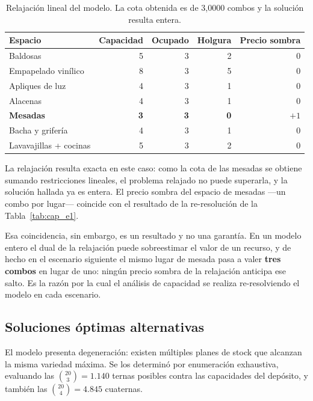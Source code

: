 \documentclass[10pt,a4paper]{article}
\newcommand{\cuello}[1]{\textbf{\textcolor{limita}{#1}}}
\begin{document}
\begin{table}[H]
\centering\small
\caption{Relajación lineal del modelo. La cota obtenida es de 3,0000 combos y
la solución resulta entera.}
\label{tab:relajacion_e1}
\begin{tabular}{lrrr r}
\toprule
\textbf{Espacio} & \textbf{Capacidad} & \textbf{Ocupado} & \textbf{Holgura} & \textbf{Precio sombra} \\
\midrule
Baldosas               & 5 & 3 & 2 & 0 \\
Empapelado vinílico    & 8 & 3 & 5 & 0 \\
Apliques de luz        & 4 & 3 & 1 & 0 \\
Alacenas               & 4 & 3 & 1 & 0 \\
\cuello{Mesadas}       & \cuello{3} & \cuello{3} & \cuello{0} & \cuello{$+1$} \\
Bacha y grifería       & 4 & 3 & 1 & 0 \\
Lavavajillas + cocinas & 5 & 3 & 2 & 0 \\
\bottomrule
\end{tabular}
\end{table}

La relajación resulta exacta en este caso: como la cota de las mesadas se
obtiene sumando restricciones lineales, el problema relajado no puede superarla,
y la solución hallada ya es entera. El precio sombra del espacio de mesadas
—un combo por lugar— coincide con el resultado de la re-resolución de la
Tabla~\ref{tab:cap_e1}.

Esa coincidencia, sin embargo, es un resultado y no una garantía. En un modelo
entero el dual de la relajación puede sobreestimar el valor de un recurso, y de
hecho en el escenario siguiente el mismo lugar de mesada pasa a valer
\textbf{tres combos} en lugar de uno: ningún precio sombra de la relajación
anticipa ese salto. Es la razón por la cual el análisis de capacidad se realiza
re-resolviendo el modelo en cada escenario.

\subsection{Soluciones óptimas alternativas}
\label{sec:esc1_alt}

El modelo presenta degeneración: existen múltiples planes de stock que alcanzan
la misma variedad máxima. Se los determinó por enumeración exhaustiva,
evaluando las $\binom{20}{3} = 1.140$ ternas posibles contra las capacidades del
depósito, y también las $\binom{20}{4} = 4.845$ cuaternas.
\end{document}
